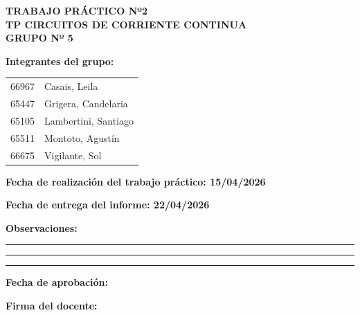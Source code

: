 
\thispagestyle{empty}

\begin{center}
    
    {\large \textbf{TRABAJO PRÁCTICO Nº2}}\\[0.5cm]
    
    {\Large \textbf{TP CIRCUITOS DE CORRIENTE CONTINUA}}\\[1cm]
    
    {\normalsize \textbf{GRUPO Nº 5 }}\\[0.5cm]

\end{center}

\vspace{0.5cm}

\textbf{Integrantes del grupo:}

\vspace{0.3cm}

\begin{tabular}{p{5cm} p{8cm}}
66967 & Casais, Leila \\
65447 & Grigera, Candelaria \\
65105 & Lambertini, Santiago \\
65511 & Montoto, Agustín \\
66675 & Vigilante, Sol \\
\end{tabular}

\vspace{0.8cm}

\textbf{Fecha de realización del trabajo práctico: 15/04/2026} \\
\vspace{0.3cm}

\textbf{Fecha de entrega del informe: 22/04/2026}

\vspace{1cm}

\textbf{Observaciones:}

\vspace{0.5cm}

\hrule
\vspace{0.3cm}
\hrule
\vspace{0.3cm}
\hrule

\vspace{1cm}

\textbf{Fecha de aprobación:}

\vspace{0.8cm}

\textbf{Firma del docente:}

\newpage


